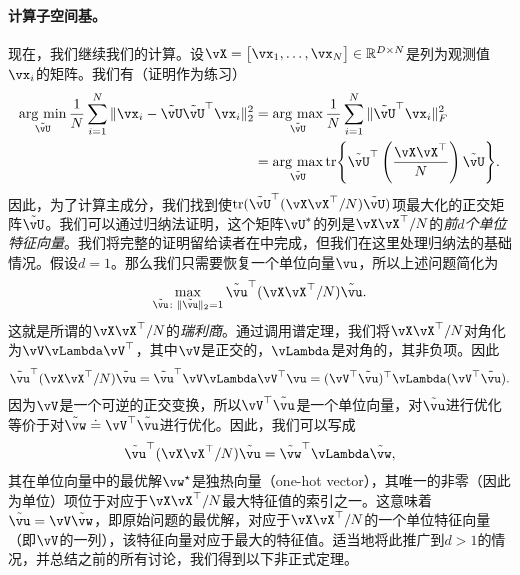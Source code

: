 \documentclass[../../book-main.tex]{subfiles}
\begin{document}
\paragraph{计算子空间基。}
现在，我们继续我们的计算。设\(\vX = \mat{\vx_{1}, \dots, \vx_{N}} \in \R^{D \times N}\)是列为观测值\(\vx_{i}\)的矩阵。我们有（证明作为练习）
\begin{align}
    \argmin_{\tilde{\vU}}\frac{1}{N}\sum_{i = 1}^{N}\norm{\vx_{i} - \tilde{\vU}\tilde{\vU}^{\top}\vx_{i}}_{2}^{2}
    &= \argmax_{\tilde{\vU}}\frac{1}{N}\sum_{i = 1}^{N}\norm{\tilde{\vU}^{\top}\vx_{i}}_{F}^{2} \\ 
    &= \argmax_{\tilde{\vU}}\tr\rc{\tilde{\vU}^{\top}\bp{\frac{\vX\vX^{\top}}{N}}\tilde{\vU}}.
\end{align}
因此，为了计算主成分，我们找到使\(\tr(\tilde{\vU}^{\top}(\vX\vX^{\top}/N)\tilde{\vU})\)项最大化的正交矩阵\(\tilde{\vU}\)。我们可以通过归纳法证明，这个矩阵\(\vU^{\ast}\)的列是\(\vX\vX^{\top}/N\)的\textit{前\(d\)个单位特征向量}。我们将完整的证明留给读者在中完成，但我们在这里处理归纳法的基础情况。假设\(d = 1\)。那么我们只需要恢复一个单位向量\(\vu\)，所以上述问题简化为
\begin{equation}
    \max_{\tilde{\vu} \colon \norm{\tilde{\vu}}_{2} = 1} \tilde{\vu}^{\top}(\vX\vX^{\top}/N)\tilde{\vu}.
\end{equation}
这就是所谓的\(\vX\vX^{\top}/N\)的\textit{瑞利商}。通过调用谱定理，我们将\(\vX\vX^{\top}/N\)对角化为\(\vV\vLambda\vV^{\top}\)，其中\(\vV\)是正交的，\(\vLambda\)是对角的，其非负项。因此
\begin{equation}
    \tilde{\vu}^{\top}(\vX\vX^{\top}/N)\tilde{\vu} = \tilde{\vu}^{\top}\vV\vLambda\vV^{\top}\vu = (\vV^{\top}\tilde{\vu})^{\top}\vLambda(\vV^{\top}\tilde{\vu}).
\end{equation}
因为\(\vV\)是一个可逆的正交变换，所以\(\vV^{\top}\tilde{\vu}\)是一个单位向量，对\(\tilde{\vu}\)进行优化等价于对\(\tilde{\vw} \doteq \vV^{\top}\tilde{\vu}\)进行优化。因此，我们可以写成
\begin{equation}
    \tilde{\vu}^{\top}(\vX\vX^{\top}/N)\tilde{\vu} = \tilde{\vw}^{\top}\vLambda\tilde{\vw},
\end{equation}
其在单位向量中的最优解\(\vw^{\star}\)是独热向量（one-hot vector），其唯一的非零（因此为单位）项位于对应于\(\vX\vX^{\top}/N\)最大特征值的索引之一。这意味着\(\tilde{\vu} = \vV\tilde{\vw}\)，即原始问题的最优解，对应于\(\vX\vX^{\top}/N\)的一个单位特征向量（即\(\vV\)的一列），该特征向量对应于最大的特征值。适当地将此推广到\(d > 1\)的情况，并总结之前的所有讨论，我们得到以下非正式定理。
\end{document}
